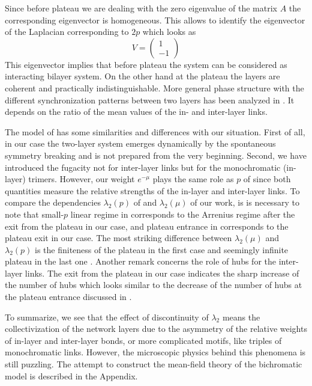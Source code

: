 \documentclass[aps,12pt]{revtex4}
\newcommand{\be}{\begin{equation}}
\newcommand{\ee}{\end{equation}}
\begin{document}
Since before plateau we are dealing with the zero eigenvalue of the matrix $A$ the corresponding eigenvector is homogeneous. This allows to identify the eigenvector of the Laplacian corresponding to $2p$  which looks as
\be
V=\left(\begin{array}{cc} 1 \\ -1
\end{array}\right)
\ee
This eigenvector implies that before plateau the system can be considered as interacting  bilayer system. On the other hand at the plateau the layers are coherent and practically indistinguishable. More general phase structure with the different synchronization patterns between two layers has been analyzed in \cite{radicchi}. It depends on the ratio of the mean values of the in- and inter-layer links.

The model of \cite{arenas2} has some similarities and differences with our situation. First of all, in our case the two-layer system emerges dynamically by the spontaneous symmetry breaking and is not prepared from the very beginning. Second, we have introduced the fugacity not for inter-layer links but for the monochromatic (in-layer) trimers. However, our weight $e^{-\mu}$ plays the same role as $p$ of \cite{arenas2} since both quantities measure the relative strengths of the in-layer and inter-layer links. To compare the dependencies $\lambda_2(p)$ of \cite{arenas2} and $\lambda_2(\mu)$  of our work, is is necessary to note that small-$p$ linear regime in \cite{arenas2} corresponds to the Arrenius regime after the exit from the plateau in our case, and plateau entrance in \cite{arenas2} corresponds to the plateau exit in our case. The most striking difference between $\lambda_2(\mu)$ and $\lambda_2(p)$ is the finiteness of the plateau in the first case and seemingly infinite plateau in the last one \cite{arenas2}.  Another remark concerns the role of hubs for the inter-layer links. The exit from the plateau in our case indicates the sharp increase of the number of hubs which looks similar to the decrease of the number of hubs at the plateau entrance discussed in \cite{hub}.

To summarize, we see that the effect of discontinuity of $\lambda_2$ means the collectivization of the network layers due to the asymmetry of the relative weights of in-layer and inter-layer bonds, or more complicated motifs, like triples of monochromatic links. However, the microscopic physics behind this phenomena is still puzzling. The attempt to construct the mean-field theory of the bichromatic model is described in the Appendix.
\end{document}
